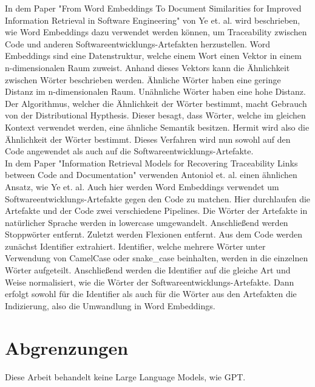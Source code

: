 In dem Paper "From Word Embeddings To Document Similarities for Improved Information Retrieval in Software Engineering" von Ye et. al. wird beschrieben, wie Word Embeddings dazu verwendet werden können, um Traceability zwischen Code und anderen Softwareentwicklungs-Artefakten herzustellen.
Word Embeddings sind eine Datenstruktur, welche einem Wort einen Vektor in einem n-dimensionalen Raum zuweist.
Anhand dieses Vektors kann die Ähnlichkeit zwischen Wörter beschrieben werden.
Ähnliche Wörter haben eine geringe Distanz im n-dimensionalen Raum.
Unähnliche Wörter haben eine hohe Distanz.
Der Algorithmus, welcher die Ähnlichkeit der Wörter bestimmt, macht Gebrauch von der Distributional Hypthesis.
Dieser besagt, dass Wörter, welche im gleichen Kontext verwendet werden, eine ähnliche Semantik besitzen.
Hermit wird also die Ähnlichkeit der Wörter bestimmt.
Dieses Verfahren wird nun sowohl auf den Code angewendet als auch auf die Softwareentwicklungs-Artefakte.\\

In dem Paper "Information Retrieval Models for Recovering Traceability Links between Code and Documentation" verwenden Antoniol et. al. einen ähnlichen Ansatz, wie Ye et. al.
Auch hier werden Word Embeddings verwendet um Softwareentwicklungs-Artefakte gegen den Code zu matchen.
Hier durchlaufen die Artefakte und der Code zwei verschiedene Pipelines.
Die Wörter der Artefakte in natürlicher Sprache werden in lowercase umgewandelt.
Anschließend werden Stoppwörter entfernt.
Zuletzt werden Flexionen entfernt.
Aus dem Code werden zunächst Identifier extrahiert.
Identifier, welche mehrere Wörter unter Verwendung von CamelCase oder snake\_case beinhalten, werden in die einzelnen Wörter aufgeteilt.
Anschließend werden die Identifier auf die gleiche Art und Weise normalisiert, wie die Wörter der Softwareentwicklungs-Artefakte.
Dann erfolgt sowohl für die Identifier als auch für die Wörter aus den Artefakten die Indizierung, also die Umwandlung in Word Embeddings.

\section{Abgrenzungen}
Diese Arbeit behandelt keine Large Language Models, wie GPT.